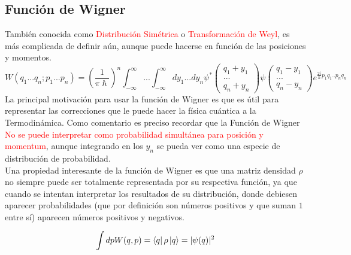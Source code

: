 \documentclass{book}
\begin{document}
\subsection{Función de Wigner}
También conocida como \textcolor{red}{Distribución Simétrica} o \textcolor{red}{Transformación de Weyl}, es más complicada de definir aún, aunque puede hacerse en función de las posiciones y momentos. 
\begin{equation}\label{eq6.3}W(q_1...q_n;p_1...p_n)=(\frac{1}{\pi\hslash})^n \int_{-\infty}^\infty ... \int_{-\infty}^\infty dy_1...dy_n\psi^*\begin{pmatrix} q_1+y_1\\ ...\\ q_n+y_n\end{pmatrix}\psi\begin{pmatrix}q_1-y_1\\ ...\\ q_n-y_n\end{pmatrix}e^{\frac{2i}{\hslash}p_1q_1..p_nq_n}\end{equation}
La principal motivación para usar la función de Wigner es que es útil para representar las correcciones que le puede hacer la física cuántica a la Termodinámica. Como comentario es preciso recordar que la Función de Wigner \textcolor{red}{No se puede interpretar como probabilidad simultánea para posición y momentum}, aunque integrando en los $y_n$ se pueda ver como una especie de distribución de probabilidad.\\

Una propiedad interesante de la función de Wigner es que una matriz densidad $\rho$ no siempre puede ser totalmente representada por su respectiva función, ya que cuando se intentan interpretar los resultados de su distribución, donde debiesen aparecer probabilidades (que por definición son números positivos y que suman $1$ entre sí) aparecen números positivos y negativos.

\begin{equation}\label{eq6.4}\int dp W(q,p)=\bra{q}\rho\ket{q}=\lvert\psi(q)\rvert^2\end{equation}
\end{document}
